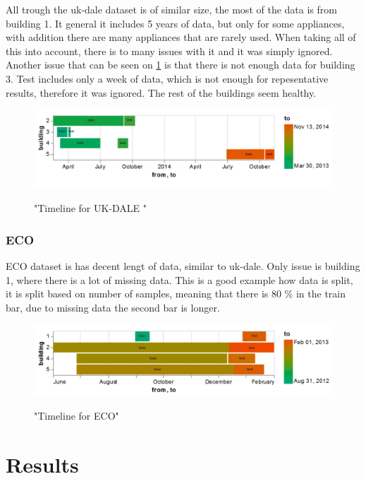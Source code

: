 All trough the uk-dale dataset is of similar size, the most of the data is from building 1.
It general it includes 5 years of data, but only for some appliances, with addition there 
are many appliances that are rarely used.
When taking all of this into account, there is to many issues with it and it was simply ignored.
Another issue that can be seen on \ref{fig:ukdale_timeline} is that there is not enough data for 
building 3. Test includes only a week of data, which is not enough for repesentative results, therefore it was ignored.
The rest of the buildings seem healthy.

\begin{figure}[H]
	\centering
	\caption{"Timeline for UK-DALE "}
	\includegraphics[width=1\textwidth]{Figures/EC/ukdale_timeline.png}
	\label{fig:ukdale_timeline}
\end{figure}

\subsubsection{ECO}
ECO dataset is has decent lengt of data, similar to uk-dale. 
Only issue is building 1, where there is a lot of missing data.
This is a good example how data is split, it is split based on number of samples,
meaning that there is 80 \% in the train bar, due to missing data the second bar is longer. 

\begin{figure}[H]
	\centering
	\caption{"Timeline for ECO"}
	\includegraphics[width=1\textwidth]{Figures/EC/eco_timeline.png}
	\label{fig:eco_timeline}
\end{figure}

\section{Results}

